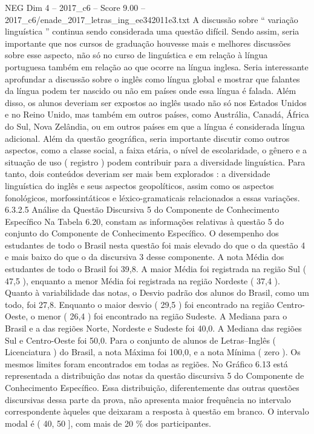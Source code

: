 \begin{textsample}{NEG Dim 4 – 2017\_c6 – Score 9.00 – 2017\_c6/enade\_2017\_letras\_ing\_ee342011e3.txt}
A discussão sobre “ variação linguística ” continua sendo considerada uma questão difícil.
Sendo assim, seria importante que nos cursos de graduação houvesse mais e melhores discussões sobre esse aspecto, não só no curso de linguística e em relação à língua portuguesa também em relação ao que ocorre na língua inglesa.
Seria interessante aprofundar a discussão sobre o inglês como língua global e mostrar que falantes da língua podem ter nascido ou não em países onde essa língua é falada.
Além disso, os alunos deveriam ser expostos ao inglês usado não só nos Estados Unidos e no Reino Unido, mas também em outros países, como Austrália, Canadá, África do Sul, Nova Zelândia, ou em outros países em que a língua é considerada língua adicional.
Além da questão geográfica, seria importante discutir como outros aspectos, como a classe social, a faixa etária, o nível de escolaridade, o gênero e a situação de uso ( registro ) podem contribuir para a diversidade linguística.
Para tanto, dois conteúdos deveriam ser mais bem explorados : a diversidade linguística do inglês e seus aspectos geopolíticos, assim como os aspectos fonológicos, morfossintáticos e léxico-gramaticais relacionados a essas variações. 6.3.2.5 Análise da Questão Discursiva 5 do Componente de Conhecimento Específico Na Tabela 6.20, constam as informações relativas à questão 5 do conjunto do Componente de Conhecimento Específico.
O desempenho dos estudantes de todo o Brasil nesta questão foi mais elevado do que o da questão 4 e mais baixo do que o da discursiva 3 desse componente.
A nota Média dos estudantes de todo o Brasil foi 39,8.
A maior Média foi registrada na região Sul ( 47,5 ), enquanto a menor Média foi registrada na região Nordeste ( 37,4 ).
Quanto à variabilidade das notas, o Desvio padrão dos alunos do Brasil, como um todo, foi 27,8.
Enquanto o maior desvio ( 29,5 ) foi encontrado na região Centro-Oeste, o menor ( 26,4 ) foi encontrado na região Sudeste.
A Mediana para o Brasil e a das regiões Norte, Nordeste e Sudeste foi 40,0.
A Mediana das regiões Sul e Centro-Oeste foi 50,0.
Para o conjunto de alunos de Letras–Inglês ( Licenciatura ) do Brasil, a nota Máxima foi 100,0, e a nota Mínima ( zero ).
Os mesmos limites foram encontrados em todas as regiões.
No Gráfico 6.13 está representada a distribuição das notas da questão discursiva 5 do Componente de Conhecimento Específico.
Essa distribuição, diferentemente das outras questões discursivas dessa parte da prova, não apresenta maior frequência no intervalo correspondente àqueles que deixaram a resposta à questão em branco.
O intervalo modal é ( 40, 50 ], com mais de 20 \% dos participantes.

\end{textsample}
